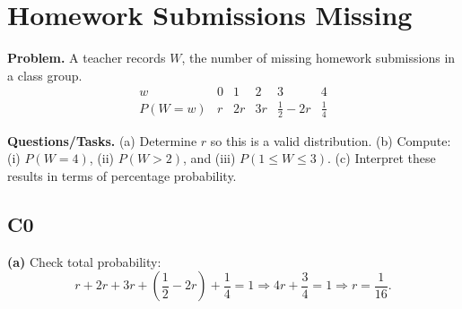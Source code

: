 		\section{Homework Submissions Missing}
		
		\textbf{Problem.}
		A teacher records $W$, the number of missing homework submissions in a class group.
		\[
		\begin{array}{c|ccccc}
			w & 0 & 1 & 2 & 3 & 4\\
			\hline
			P(W=w) & r & 2r & 3r & \frac{1}{2}-2r & \frac{1}{4}
		\end{array}
		\]
		
		\textbf{Questions/Tasks.}
		(a) Determine $r$ so this is a valid distribution.
		(b) Compute: (i) $P(W=4)$, (ii) $P(W>2)$, and (iii) $P(1\le W\le 3)$.
		(c) Interpret these results in terms of percentage probability.
		
		\subsection*{C0}

		\textbf{(a)} Check total probability:
		\[
		r+2r+3r+\left(\frac{1}{2}-2r\right)+\frac{1}{4}=1
		\Rightarrow 4r+\frac{3}{4}=1
		\Rightarrow r=\frac{1}{16}.
		\]

